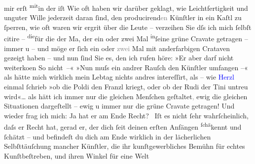                mir erſt \substVorne{}\textsuperscript{mit}\substDazwischen{}in\substHinten{} der \label{T_L02988-2v}\label{T_L02988-2h} iſt{\dotstwo} Wie oft haben wir darüber geklagt, wie Leichtfertigkeit
               und unguter Wille jederzeit daran ſind, den
                  producirend\textcolor{gray}{en}{ }{\pb}Künſtler in ein Kaſtl zu ſperren, wie oft
               waren wir ergri{\geminationm}t\strikeout{,} über
               die Leute – verzeihen Sie dſs ich mich ſelbſt citire – \substVorne{}\textsuperscript{die}\substDazwischen{}fü\substHinten{}r die der Ma{\geminationn}, der ein oder zwei Mal \substVorne{}\textsuperscript{in}\substDazwischen{}ſe\substHinten{}ine grüne Cravate getragen – immer u \label{T_L02988-3v}\label{T_L02988-3h} – und möge er ſich ein oder
                  \textcolor{gray}{zwei} Mal mit anderfarbigen Crataven gezeigt haben – und nun
               ſind Sie es, den {\pb}ich rufen höre: »Er aber
               darf nicht weiterko{\geminationm}en {\dotstwo} So
               nicht –« »Nun muſs ein andrer Rauſch den Künſtler umfangen –« als hätte mich wirklich
               mein Lebtag nichts andres intereſſirt, als – wie \textcolor{blue}{Herzl}{}\ledrightnote{\textcolor{blue}{Theodor Herzl}} einmal ſchrieb »ob die Poldi den Franzl kriegt, oder ob der Rudi der Tini untreu wird«{\dots} als hätt ich immer nur die gleichen Menſchen
                  geſtaltet\textcolor{gray}{,}{ }{\pb}ewig die gleichen Situationen dargeſtellt –
               ewig u immer nur die grüne Cravate getragen! Und wieder frag ich mich: Ja hat er am
               Ende Recht? {\dotstwo} Iſt es nicht ſehr wahrſcheinlich, daſs er
               Recht hat, gerad er, der dich ſeit deinen erſten Anfängen \substVorne{}\textsuperscript{ſchä}\substDazwischen{}ke\substHinten{}nnt und ſchätzt – und befindeſt du dich am Ende wirklich in der lächerlichen
               Selbſttäuſchung mancher {\pb}Künſtler, die ihr
               kunſtgewerbliches Bemühn für echtes Kunſtbeſtreben, und ihren Winkel für eine Welt
